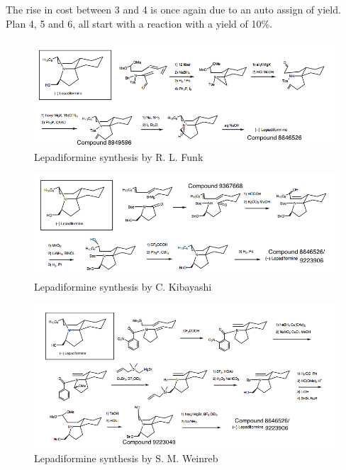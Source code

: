 \documentclass[a4paper,10pt,titlepage]{paper}
\begin{document}
The rise in cost between 3 and 4 is once again due to an auto assign of yield. Plan 4, 5 and 6, all start with a reaction with a yield of 10\%.

\begin{figure}
\centering
\includegraphics[scale=0.5, angle=90]{Synteseplaner/Lepadiformine/Funk.png}
\caption{Lepadiformine synthesis by R. L. Funk \cite{SynthesisPlans}}
\label{fig::Funk}
\end{figure}

\begin{figure}
\centering
\includegraphics[scale=0.5, angle=90]{Synteseplaner/Lepadiformine/Kibayashi.png}
\caption{Lepadiformine synthesis by C. Kibayashi  \cite{SynthesisPlans}}
\label{fig::Kibayashi}
\end{figure}

\begin{figure}
\centering
\includegraphics[scale=0.5, angle=90]{Synteseplaner/Lepadiformine/Weinreb.png}
\caption{Lepadiformine synthesis by S. M. Weinreb \cite{SynthesisPlans}}
\label{fig::Weinreb}
\end{figure}
\end{document}
